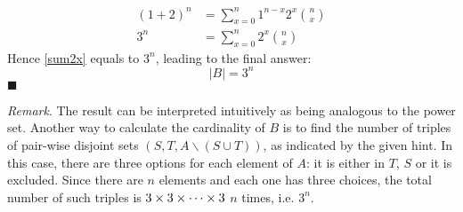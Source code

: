 \documentclass[12pt]{article}
\newcommand{\q}{\hfill $\blacksquare$}
\newenvironment{ps}
{\begin{enumerate}[leftmargin=0em, itemindent=1.5em]}
{\end{enumerate}}
\begin{document}
\begin{ps}
    \begin{align*}
        (1 + 2)^n &= \sum_{x=0}^n 1^{n-x}2^x \binom{n}{x}\\
        3^n &= \sum_{x=0}^n 2^x \binom{n}{x}
    \end{align*} 
    Hence \eqref{sum2x} equals to \( 3^n \), leading to the final answer:
    \[
        |B| = 3^n 
    \] \q
    
    \textit{Remark}. The result can be interpreted intuitively as being analogous to the power set.
    Another way to calculate the cardinality of \( B \) is to find the number of triples of
    pair-wise disjoint sets \( (S, T, A \backslash (S \cup T)) \), as indicated by the given hint. In this case,
    there are three options for each element of \( A \): it is either in \( T \), \( S \) or it is
    excluded. Since there are \( n \) elements and each one has three choices, the total number of
    such triples is \( 3 \times 3 \time 3 \times \dots \times 3 \) \( n \) times, i.e. \( 3^n \).

\end{ps}
\end{document}
